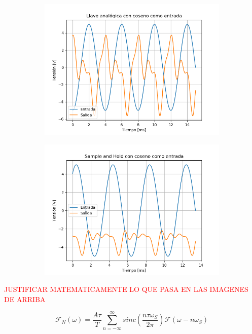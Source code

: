 \begin{figure}[H]
	\begin{subfigure}{.5\textwidth}
	\centering
	\includegraphics[width=\textwidth]{ImagenesEjercicio6/puntoc-d/LA - Cos.png}
	\end{subfigure}
	\begin{subfigure}{.5\textwidth}
	\centering
	\includegraphics[width=\textwidth]{ImagenesEjercicio6/puntoc-d/SH - Cos.png}
	\end{subfigure}
\end{figure}

{\huge \textcolor{red}{JUSTIFICAR MATEMATICAMENTE LO QUE PASA EN LAS IMAGENES DE ARRIBA}}

\begin{equation*}
	\mathcal{F}_{N} \left( \omega \right) = \frac{A \tau}{T} \sum_{n=-\infty}^{\infty} sinc \left( \frac{n \tau \omega_S}{2 \pi} \right) \mathcal{F} \left( \omega - n \omega_S \right)
\end{equation*}

